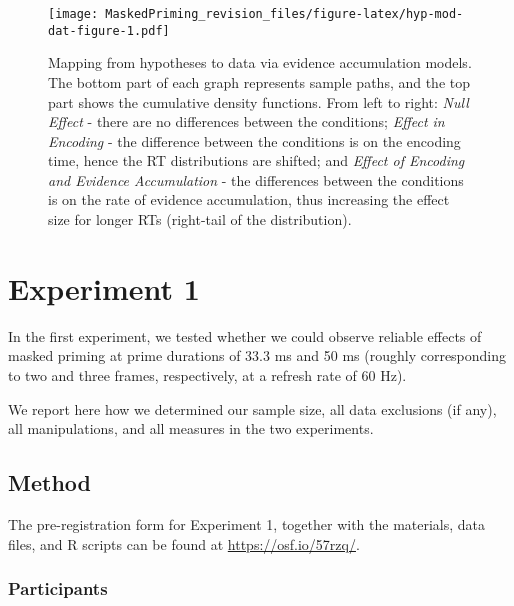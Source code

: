 \documentclass[
  english,
  man,floatsintext]{apa6}
\begin{document}
\newpage

\begin{figure}
\centering
\texttt{[image: MaskedPriming\_revision\_files/figure-latex/hyp-mod-dat-figure-1.pdf]}
\caption{\label{fig:hyp-mod-dat-figure}Mapping from hypotheses to data via evidence accumulation models. The bottom part of each graph represents sample paths, and the top part shows the cumulative density functions. From left to right: \emph{Null Effect} - there are no differences between the conditions; \emph{Effect in Encoding} - the difference between the conditions is on the encoding time, hence the RT distributions are shifted; and \emph{Effect of Encoding and Evidence Accumulation} - the differences between the conditions is on the rate of evidence accumulation, thus increasing the effect size for longer RTs (right-tail of the distribution).}
\end{figure}

\hypertarget{experiment-1}{%
\section{Experiment 1}\label{experiment-1}}

In the first experiment, we tested whether we could observe reliable effects of masked priming at prime durations of 33.3 ms and 50 ms (roughly corresponding to two and three frames, respectively, at a refresh rate of 60 Hz).

We report here how we determined our sample size, all data exclusions (if any), all manipulations, and all measures in the two experiments.

\hypertarget{method}{%
\subsection{Method}\label{method}}

The pre-registration form for Experiment 1, together with the materials, data files, and R scripts can be found at \url{https://osf.io/57rzq/}.

\hypertarget{participants}{%
\subsubsection{Participants}\label{participants}}
\end{document}
